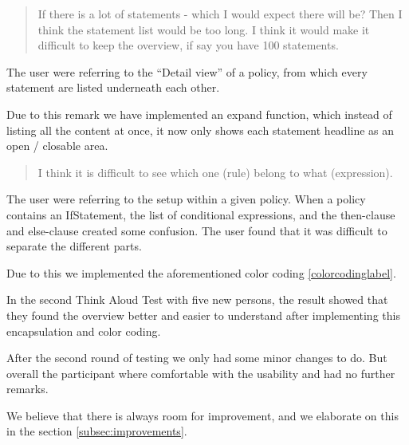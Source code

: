 \begin{quotation}
If there is a lot of statements - which I would expect there will be? Then I think the statement list would be too long. I think it would make it difficult to keep the overview, if say you have 100 statements.
\end{quotation}

The user were referring to the “Detail view” of a policy, from which every statement are listed underneath each other. 

Due to this remark we have implemented an expand function, which instead of listing all the content at once, it now only shows each statement headline as an open / closable area.
 
\begin{quotation}
I think it is difficult to see which one (rule) belong to what (expression).
\end{quotation}

The user were referring to the setup within a given policy. When a policy contains an IfStatement, the list of conditional expressions, and the then-clause and else-clause created some confusion. The user found that it was difficult to separate the different parts.

Due to this we implemented the aforementioned color coding \ref{colorcodinglabel}.

In the second Think Aloud Test with five new persons, the result showed that they found the overview better and easier to understand after implementing this encapsulation and color coding.

After the second round of testing we only had some minor changes to do. But overall the participant where comfortable with the usability and had no further remarks.

We believe that there is always room for improvement, and we elaborate on this in the section \ref{subsec:improvements}.